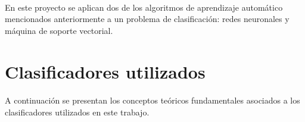 \paragraph{}En este proyecto se aplican dos de los algoritmos de aprendizaje automático mencionados anteriormente a un problema de clasificación: redes neuronales y máquina de soporte vectorial.

\section{Clasificadores utilizados}

\paragraph{}A continuación se presentan los conceptos teóricos fundamentales asociados a los clasificadores utilizados en este trabajo.





